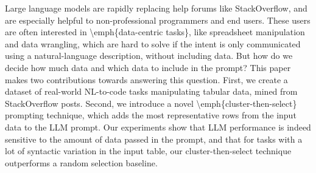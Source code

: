 Large language models are rapidly replacing help forums like StackOverflow, and are especially helpful to non-professional programmers and end users. These users are often interested in \textbackslash{}emph\{data-centric tasks\}, like spreadsheet manipulation and data wrangling, which are hard to solve if the intent is only communicated using a natural-language description, without including data. But how do we decide how much data and which data to include in the prompt? This paper makes two contributions towards answering this question.  First, we create a dataset of real-world NL-to-code tasks manipulating tabular data, mined from StackOverflow posts. Second, we introduce a novel \textbackslash{}emph\{cluster-then-select\} prompting technique, which adds the most representative rows from the input data to the LLM prompt. Our experiments show that LLM performance is indeed sensitive to the amount of data passed in the prompt, and that for tasks with a lot of syntactic variation in the input table, our cluster-then-select technique outperforms a random selection baseline.